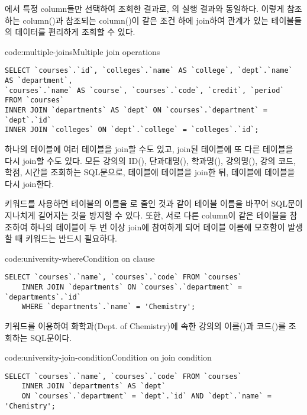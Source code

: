 \는 에서 특정 column들만 선택하여 조회한 결과로, 의 실행 결과와 동일하다. 이렇게 참조하는 column()과 참조되는 column()이 같은 조건 하에 join하여 관계가 있는 테이블들의 데이터를 편리하게 조회할 수 있다.
\clearpage

\begin{code}{code:multiple-joins}{Multiple join operations}
\begin{verbatim}
SELECT `courses`.`id`, `colleges`.`name` AS `college`, `dept`.`name` AS `department`,
`courses`.`name` AS `course`, `courses`.`code`, `credit`, `period` FROM `courses`
INNER JOIN `departments` AS `dept` ON `courses`.`department` = `dept`.`id`
INNER JOIN `colleges` ON `dept`.`college` = `colleges`.`id`;
\end{verbatim}
\end{code}

하나의 테이블에 여러 테이블을 join할 수도 있고, join된 테이블에 또 다른 테이블을 다시 join할 수도 있다. \는 모든 강의의 ID(), 단과대명(), 학과명(), 강의명(), 강의 코드, 학점, 시간을 조회하는 SQL문으로,  테이블에  테이블을 join한 뒤,  테이블에  테이블을 다시 join한다.

 키워드를 사용하면  테이블의 이름을 로 줄인 것과 같이 테이블 이름을 바꾸어 SQL문이 지나치게 길어지는 것을 방지할 수 있다. 또한, 서로 다른 column이 같은 테이블을 참조하여 하나의 테이블이 두 번 이상 join에 참여하게 되어 테이블 이름에 모호함이 발생할 때  키워드는 반드시 필요하다.

\begin{code}{code:university-where}{Condition on  clause}
\begin{verbatim}
SELECT `courses`.`name`, `courses`.`code` FROM `courses`
    INNER JOIN `departments` ON `courses`.`department` = `departments`.`id`
    WHERE `departments`.`name` = 'Chemistry';
\end{verbatim}
\end{code}

\는  키워드를 이용하여 화학과(Dept. of Chemistry)에 속한 강의의 이름()과 코드()를 조회하는 SQL문이다.

\begin{code}{code:university-join-condition}{Condition on join condition}
\begin{verbatim}
SELECT `courses`.`name`, `courses`.`code` FROM `courses`
    INNER JOIN `departments` AS `dept`
    ON `courses`.`department` = `dept`.`id` AND `dept`.`name` = 'Chemistry';
\end{verbatim}
\end{code}

